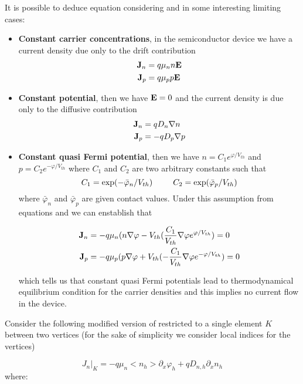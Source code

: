It is possible to deduce equation  
considering  and  in some interesting limiting cases:
\begin{itemize}
\item \textbf{Constant carrier concentrations}, in the semiconductor device we have  a current density due only to the drift contribution
\begin{align*}
\mathbf{J}_n & = q\mu_n n \mathbf{E} \\
\mathbf{J}_p & = q\mu_p p \mathbf{E}
\end{align*}
\item \textbf{Constant potential}, then we have $\mathbf{E}=0$ and the current density is due only to the diffusive contribution
\begin{align*}
\mathbf{J}_n & = qD_n\nabla n \\
\mathbf{J}_p & = -qD_p\nabla p
\end{align*}
\item \textbf{Constant quasi Fermi potential}, then we have $n=C_1e^{\varphi / V_{th}}$ and $p=C_2e^{-\varphi / V_{th}}$ where $C_1$ and $C_2$ are two arbitrary constants such that
\begin{equation*}
C_1 = \exp(-\bar\varphi_n/V_{th}) \psp{15} C_2 = \exp(\bar\varphi_p/V_{th})
\end{equation*}
where $\bar\varphi_n$ and $\bar\varphi_p$ are given contact values. Under this assumption from equations  and  we can enstablish that

\begin{align*}
\mathbf{J}_n & = -q\mu_n (n\nabla 	\varphi - V_{th} (\dfrac{C_1}{V_{th}}\nabla \varphi e^{\varphi / V_{th}}) = 0\\
\mathbf{J}_p & = -q\mu_p (p\nabla 	\varphi + V_{th} (-\dfrac{C_1}{V_{th}}\nabla \varphi e^{-\varphi / V_{th}}) = 0
\end{align*}

which tells us that constant quasi Fermi potentials lead to thermodynamical equilibrium condition for the carrier densities and this implies no current flow in the device.
\end{itemize}

Consider  the following modified version of  restricted to a single element $K$ between two vertices (for the sake of simplicity we consider local indices for the vertices)

\begin{equation}
\label{eq: j element 1d perturbata}
J_n|_K = -q\mu_n <n_h> \partial_x \varphi_h + qD_{n,h} \partial_x n_h
\end{equation}
where:

